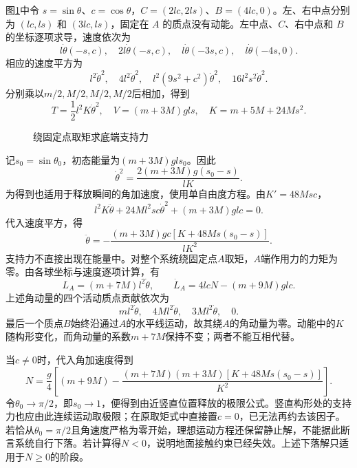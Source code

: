 \begin{solution}
图\ref{fig:hw1-4-s}中令 $s=\sin\theta$、$c=\cos\theta$，$C=(2lc,2ls)$、$B=(4lc,0)$。左、右中点分别为 $(lc,ls)$ 和 $(3lc,ls)$，固定在 $A$ 的质点没有动能。左中点、$C$、右中点和 $B$ 的坐标逐项求导，速度依次为
\[
l\dot\theta(-s,c),\quad 2l\dot\theta(-s,c),\quad
l\dot\theta(-3s,c),\quad l\dot\theta(-4s,0).
\]
相应的速度平方为
\[
l^2\dot\theta^2,\quad4l^2\dot\theta^2,\quad
l^2(9s^2+c^2)\dot\theta^2,\quad16l^2s^2\dot\theta^2.
\]
分别乘以$m/2,M/2,M/2,M/2$后相加，得到
\[
 T=\frac12l^2K\dot\theta^2,\quad
 V=(m+3M)gls,\quad K=m+5M+24Ms^2.
\]

\begin{figure}[H]\centering
{}
\caption{绕固定点取矩求底端支持力}\label{fig:hw1-4-s}
\end{figure}

记$s_0=\sin\theta_0$，初态能量为$(m+3M)gls_0$。因此
\[
\dot\theta^2=\frac{2(m+3M)g(s_0-s)}{lK}.
\]
为得到也适用于释放瞬间的角加速度，使用单自由度方程。由$K'=48Msc$，
\[
l^2K\ddot\theta+24Ml^2sc\dot\theta^2+(m+3M)glc=0.
\]
代入速度平方，得
\[
\ddot\theta=-\frac{(m+3M)gc[K+48Ms(s_0-s)]}{lK^2}.
\]
支持力不直接出现在能量中。对整个系统绕固定点$A$取矩，$A$端作用力的力矩为零。由各球坐标与速度逐项计算，有
\[
 L_A=(m+7M)l^2\dot\theta,\qquad
 \dot L_A=4lcN-(m+9M)glc.
\]
上述角动量的四个活动质点贡献依次为
\[
 ml^2\dot\theta,\quad4Ml^2\dot\theta,\quad
 3Ml^2\dot\theta,\quad0.
\]
最后一个质点$B$始终沿通过$A$的水平线运动，故其绕$A$的角动量为零。动能中的$K$随构形变化，而角动量的系数$m+7M$保持不变；两者不能互相代替。

当$c\ne0$时，代入角加速度得到
\[
 \boxed{N=\frac g4\left[(m+9M)-
 \frac{(m+7M)(m+3M)[K+48Ms(s_0-s)]}{K^2}\right]}.
\]
令$\theta_0\to\pi/2$，即$s_0\to1$，便得到由近竖直位置释放的极限公式。竖直构形处的支持力也应由此连续运动取极限；在原取矩式中直接置$c=0$，已无法再约去该因子。若恰从$\theta_0=\pi/2$且角速度严格为零开始，理想运动方程还保留静止解，不能据此断言系统自行下落。若计算得$N<0$，说明地面接触约束已经失效。上述下落解只适用于$N\ge0$的阶段。


\end{solution}



